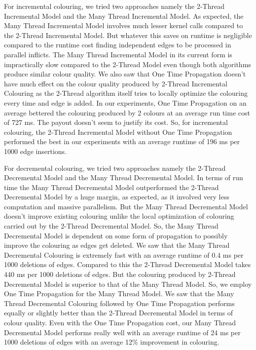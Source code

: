 \documentclass[MTech]{iitmdiss}
\begin{document}
For incremental colouring, we tried two approaches namely the 2-Thread Incremental Model and the Many Thread Incremental Model. As expected, the Many Thread Incremental Model involves much lesser kernel calls compared to the 2-Thread Incremental Model. But whatever this saves on runtime is negligible compared to the runtime cost finding independent edges to be processed in parallel inflicts. The Many Thread Incremental Model in its current form is impractically slow compared to the 2-Thread Model even though both algorithms produce similar colour quality. We also saw that One Time Propagation doesn't have much effect on the colour quality produced by 2-Thread Incremental Colouring as the 2-Thread algorithm itself tries to locally optimize the colouring every time and edge is added. In our experiments, One Time Propagation on an average bettered the colouring produced by 2 colours at an average run time cost of 727 ms. The payout doesn't seem to justify its cost. So, for incremental colouring, the 2-Thread Incremental Model without One Time Propagation performed the best in our experiments with an average runtime of 196 ms per 1000 edge insertions.

For decremental colouring, we tried two approaches namely the 2-Thread Decremental Model and the Many Thread Decremental Model. In terms of run time the Many Thread Decremental Model outperformed the 2-Thread Decremental Model by a huge margin, as expected, as it involved very less computation and massive parallelism. But the Many Thread Decremental Model doesn't improve existing colouring unlike the local optimization of colouring carried out by the 2-Thread Decremental Model. So, the Many Thread Decremental Model is dependent on some form of propagation to possibly improve the colouring as edges get deleted. We saw that the Many Thread Decremental Colouring is extremely fast with an average runtime of 0.4 ms per 1000 deletions of edges. Compared to this the 2-Thread Decremental Model takes 440 ms per 1000 deletions of edges. But the colouring produced by 2-Thread Decremental Model is superior to that of the Many Thread Model. So, we employ One Time Propagation for the Many Thread Model. We saw that the Many Thread Decremental Colouring followed by One Time Propagation performs equally or slightly better than the 2-Thread Decremental Model in terms of colour quality. Even with the One Time Propagation cost, our Many Thread Decremental Model performs really well with an average runtime of 24 ms per 1000 deletions of edges with an average 12\% improvement in colouring.
\end{document}
